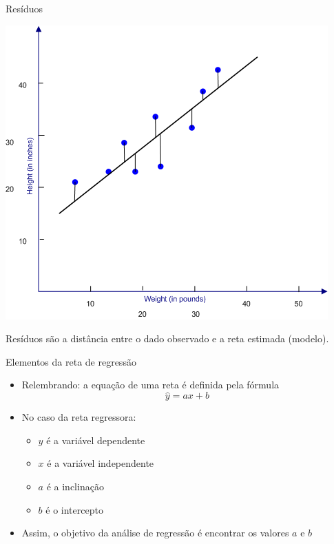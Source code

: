 \documentclass{beamer}
\begin{document}
\begin{frame}{Resíduos}
  \begin{center}
      \includegraphics[height=0.6\textheight]{residuos}
  \end{center}

  \begin{definition}
    Resíduos são a distância entre o dado observado e a reta estimada
    (modelo).
  \end{definition}
\end{frame}

\begin{frame}{Elementos da reta de regressão}
  \begin{itemize}
  \item Relembrando: a equação de uma reta é definida pela fórmula
    \begin{displaymath}
      \hat{y} = a x + b
    \end{displaymath}
  \item No caso da reta regressora:
    \begin{itemize}
    \item $y$ é a variável dependente
    \item $x$ é a variável independente
    \item $a$ é a inclinação
    \item $b$ é o intercepto
    \end{itemize}
  \item Assim, o objetivo da análise de regressão é encontrar os
    valores $a$ e $b$
  \end{itemize}
\end{frame}
\end{document}
